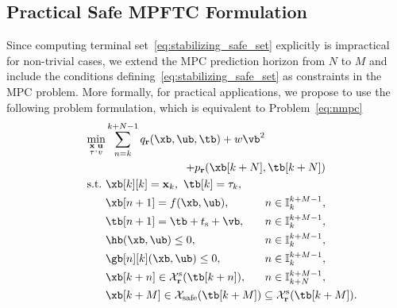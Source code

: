 \documentclass[journal]{IEEEtran}
\newcommand{\x}{{\mathbf{x}}}
\renewcommand{\u}{{\mathbf{u}}}
\newcommand{\vv}{{{v}}}
\renewcommand{\r}{{\mathbf{r}}}
\newcommand{\bx}{{\x}}
\newcommand{\bu}{{\u}}
\newcommand{\btau}{{\tau}}
\newcommand{\bv}{{\vv}}
\begin{document}
	\subsection{Practical Safe MPFTC Formulation}
	Since computing terminal set~\eqref{eq:stabilizing_safe_set} explicitly is impractical for non-trivial cases, 
	we extend the MPC prediction horizon from $N$ to $M$ and include the conditions defining~\eqref{eq:stabilizing_safe_set} as constraints in the MPC problem. More formally, for practical applications, we propose to use the following problem formulation, which is equivalent to Problem~\eqref{eq:nmpc}
	\begin{subequations}\label{eq:practical}
		\begin{align}
		\min_{\substack{\bx\\\btau},\substack{\bu\\\bv}}& \sum_{n=k}^{k+N-1}
		q_\r(\xb,\ub,\tb)+w \vb^2&\\ 
		& &\hspace{-10em}+p_\r(\xb[k+N],\tb[k+N])\nonumber\\
		\text{s.t.}\ &\xb[k][k] = \x_{k},\  \tb[k] = \tau_{k},& \\
		&\xb[n+1] = f(\xb,\ub), &\hspace{-1em}n\in \mathbb{I}_k^{k+M-1},\\
		&\tb[n+1] = \tb+t_\mathrm{s}+\vb, &\hspace{-1em}n\in \mathbb{I}_k^{k+M-1},\\
		&\hb(\xb,\ub) \leq{} 0, & \hspace{-1em}n\in \mathbb{I}_k^{k+M-1},\\
		&\gb[n][k](\xb,\ub) \leq{} 0, & \hspace{-1em}n\in \mathbb{I}_k^{k+M-1},\\
		&\xb[k+n] \in\mathcal{X}_\r^\mathrm{s}(\tb[k+n]),&\hspace{-1em}n\in \mathbb{I}_{k+N}^{k+M-1},\\
		&\xb[k+M]\in\mathcal{X}_\mathrm{safe}(\tb[k+M])\subseteq\mathcal{X}_\r^\mathrm{s}(\tb[k+M]).\hspace{-10em}&
		\end{align}
	\end{subequations}
\end{document}
